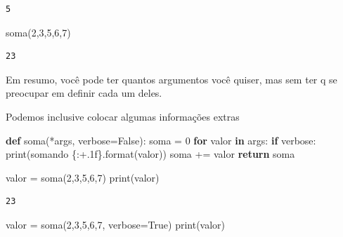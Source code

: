 \documentclass[
  letterpaper,
  DIV=11,
  numbers=noendperiod]{scrreprt}
\newenvironment{Shaded}{\begin{snugshade}}{\end{snugshade}}
\newcommand{\BuiltInTok}[1]{\textcolor[rgb]{0.00,0.23,0.31}{#1}}
\newcommand{\ControlFlowTok}[1]{\textcolor[rgb]{0.00,0.23,0.31}{\textbf{#1}}}
\newcommand{\DecValTok}[1]{\textcolor[rgb]{0.68,0.00,0.00}{#1}}
\newcommand{\KeywordTok}[1]{\textcolor[rgb]{0.00,0.23,0.31}{\textbf{#1}}}
\newcommand{\NormalTok}[1]{\textcolor[rgb]{0.00,0.23,0.31}{#1}}
\newcommand{\OperatorTok}[1]{\textcolor[rgb]{0.37,0.37,0.37}{#1}}
\newcommand{\SpecialCharTok}[1]{\textcolor[rgb]{0.37,0.37,0.37}{#1}}
\newcommand{\StringTok}[1]{\textcolor[rgb]{0.13,0.47,0.30}{#1}}
\newcommand{\VariableTok}[1]{\textcolor[rgb]{0.07,0.07,0.07}{#1}}
\begin{document}
\begin{verbatim}
5
\end{verbatim}

\begin{Shaded}
\begin{Highlighting}[]
\NormalTok{soma(}\DecValTok{2}\NormalTok{,}\DecValTok{3}\NormalTok{,}\DecValTok{5}\NormalTok{,}\DecValTok{6}\NormalTok{,}\DecValTok{7}\NormalTok{)}
\end{Highlighting}
\end{Shaded}

\begin{verbatim}
23
\end{verbatim}

Em resumo, você pode ter quantos argumentos você quiser, mas sem ter q
se preocupar em definir cada um deles.

Podemos inclusive colocar algumas informações extras

\begin{Shaded}
\begin{Highlighting}[]
\KeywordTok{def}\NormalTok{ soma(}\OperatorTok{*}\NormalTok{args, verbose}\OperatorTok{=}\VariableTok{False}\NormalTok{):}
\NormalTok{    soma }\OperatorTok{=} \DecValTok{0}
    \ControlFlowTok{for}\NormalTok{ valor }\KeywordTok{in}\NormalTok{ args:}
        \ControlFlowTok{if}\NormalTok{ verbose:}
            \BuiltInTok{print}\NormalTok{(}\StringTok{\textquotesingle{}somando }\SpecialCharTok{\{:+.1f\}}\StringTok{\textquotesingle{}}\NormalTok{.}\BuiltInTok{format}\NormalTok{(valor))}
\NormalTok{        soma }\OperatorTok{+=}\NormalTok{ valor}
    \ControlFlowTok{return}\NormalTok{ soma}
\end{Highlighting}
\end{Shaded}

\begin{Shaded}
\begin{Highlighting}[]
\NormalTok{valor }\OperatorTok{=}\NormalTok{ soma(}\DecValTok{2}\NormalTok{,}\DecValTok{3}\NormalTok{,}\DecValTok{5}\NormalTok{,}\DecValTok{6}\NormalTok{,}\DecValTok{7}\NormalTok{)}
\BuiltInTok{print}\NormalTok{(valor)}
\end{Highlighting}
\end{Shaded}

\begin{verbatim}
23
\end{verbatim}

\begin{Shaded}
\begin{Highlighting}[]
\NormalTok{valor }\OperatorTok{=}\NormalTok{ soma(}\DecValTok{2}\NormalTok{,}\DecValTok{3}\NormalTok{,}\DecValTok{5}\NormalTok{,}\DecValTok{6}\NormalTok{,}\DecValTok{7}\NormalTok{, verbose}\OperatorTok{=}\VariableTok{True}\NormalTok{)}
\BuiltInTok{print}\NormalTok{(valor)}
\end{Highlighting}
\end{Shaded}
\end{document}

